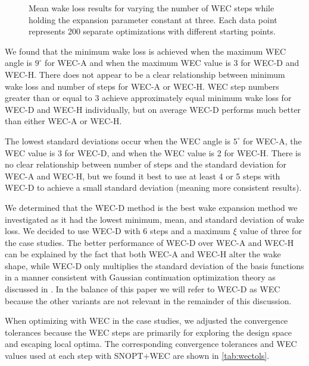 \documentclass{jpconf}
\begin{document}
\begin{figure}[ht]
\begin{minipage}[t]{0.47\textwidth}
		\caption{Mean wake loss results for varying the number of WEC steps while holding the expansion parameter constant at three. Each data point represents 200 separate optimizations with different starting points.}
		\label{fig:aepmean-ws}
	\end{minipage}
\end{figure}

We found that the minimum wake loss is achieved when the maximum WEC angle is $9^\circ$ for WEC-A and when the maximum WEC value is 3 for WEC-D and WEC-H. There does not appear to be a clear relationship between minimum wake loss and number of steps for WEC-A or WEC-H. WEC step numbers greater than or equal to 3 achieve approximately equal minimum wake loss for WEC-D and WEC-H individually, but on average WEC-D performs much better than either WEC-A or WEC-H.

The lowest standard deviations occur when the WEC angle is $5^\circ$ for WEC-A, the WEC value is 3 for WEC-D, and when the WEC value is 2 for WEC-H. There is no clear relationship between number of steps and the standard deviation for WEC-A and WEC-H, but we found it best to use at least 4 or 5 steps with WEC-D to achieve a small standard deviation (meaning more consistent results).

We determined that the WEC-D method is the best wake expansion method we investigated as it had the lowest minimum, mean, and standard deviation of wake loss. We decided to use WEC-D with 6 steps and a maximum $\xi$ value of three for the case studies. The better performance of WEC-D over WEC-A and WEC-H can be explained by the fact that both WEC-A and WEC-H alter the wake shape, while WEC-D only multiplies the standard deviation of the basis functions in a manner consistent with Gaussian continuation optimization theory as discussed in \cite{mobahi2015}. In the balance of this paper we will refer to WEC-D as WEC because the other variants are not relevant in the remainder of this discussion. 

When optimizing with WEC in the case studies, we adjusted the convergence tolerances because the WEC steps are primarily for exploring the design space and escaping local optima. The corresponding convergence tolerances and WEC values used at each step with SNOPT+WEC are shown in \cref{tab:wectols}. 
\end{document}
